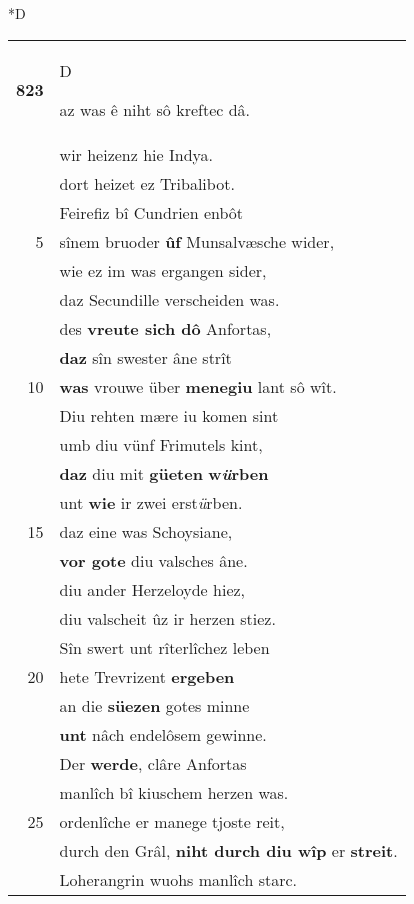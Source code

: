 \documentclass[8pt,a4paper,notitlepage]{article}
\begin{document}
\begin{table}[ht]
\begin{minipage}[t]{0.5\linewidth}
\small
\begin{center}*D
\end{center}
\begin{tabular}{rl}
\textbf{823} & \begin{large}D\end{large}az was ê niht sô kreftec dâ.\\ 
 & wir heizenz hie Indya.\\ 
 & dort heizet ez Tribalibot.\\ 
 & Feirefiz bî Cundrien enbôt\\ 
5 & sînem bruoder \textbf{ûf} Munsalvæsche wider,\\ 
 & wie ez im was ergangen sider,\\ 
 & daz Secundille verscheiden was.\\ 
 & des \textbf{vreute sich dô} Anfortas,\\ 
 & \textbf{daz} sîn swester âne strît\\ 
10 & \textbf{was} vrouwe über \textbf{menegiu} lant sô wît.\\ 
 & Diu rehten mære iu komen sint\\ 
 & umb diu vünf Frimutels kint,\\ 
 & \textbf{daz} diu mit \textbf{güeten} \textbf{w\textit{ü}rben}\\ 
 & unt \textbf{wie} ir zwei erst\textit{ü}rben.\\ 
15 & daz eine was Schoysiane,\\ 
 & \textbf{vor gote} diu valsches âne.\\ 
 & diu ander Herzeloyde hiez,\\ 
 & diu valscheit ûz ir herzen stiez.\\ 
 & Sîn swert unt rîterlîchez leben\\ 
20 & hete Trevrizent \textbf{ergeben}\\ 
 & an die \textbf{süezen} gotes minne\\ 
 & \textbf{unt} nâch endelôsem gewinne.\\ 
 & Der \textbf{werde}, clâre Anfortas\\ 
 & manlîch bî kiuschem herzen was.\\ 
25 & ordenlîche er manege tjoste reit,\\ 
 & durch den Grâl, \textbf{niht durch diu wîp} er \textbf{streit}.\\ 
 & Loherangrin wuohs manlîch starc.\\ 

\end{tabular}
\end{minipage}
\end{table}
\end{document}
